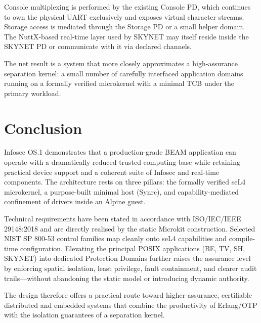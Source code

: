 \documentclass{article}
\begin{document}
Console multiplexing is performed by the existing Console PD, which continues
to own the physical UART exclusively and exposes virtual character streams.
Storage access is mediated through the Storage PD or a small helper domain.
The NuttX-based real-time layer used by SKYNET may itself reside inside the
SKYNET PD or communicate with it via declared channels.

The net result is a system that more closely approximates a high-assurance
separation kernel: a small number of carefully interfaced application domains
running on a formally verified microkernel with a minimal TCB under the
primary workload.

\section{Conclusion}

Infosec OS.1 demonstrates that a production-grade BEAM application can operate
with a dramatically reduced trusted computing base while retaining practical
device support and a coherent suite of Infosec and real-time components.
The architecture rests on three pillars: the formally verified seL4 microkernel,
a purpose-built minimal host (Synrc), and capability-mediated confinement of
drivers inside an Alpine guest.

Technical requirements have been stated in accordance with ISO/IEC/IEEE
29148:2018 and are directly realised by the static Microkit construction.
Selected NIST SP 800-53 control families map cleanly onto seL4 capabilities
and compile-time configuration. Elevating the principal POSIX applications
(BE, TV, SH, SKYNET) into dedicated Protection Domains further raises the
assurance level by enforcing spatial isolation, least privilege, fault
containment, and clearer audit trails---without abandoning the static model
or introducing dynamic authority.

The design therefore offers a practical route toward higher-assurance,
certifiable distributed and embedded systems that combine the productivity of
Erlang/OTP with the isolation guarantees of a separation kernel.
\end{document}
